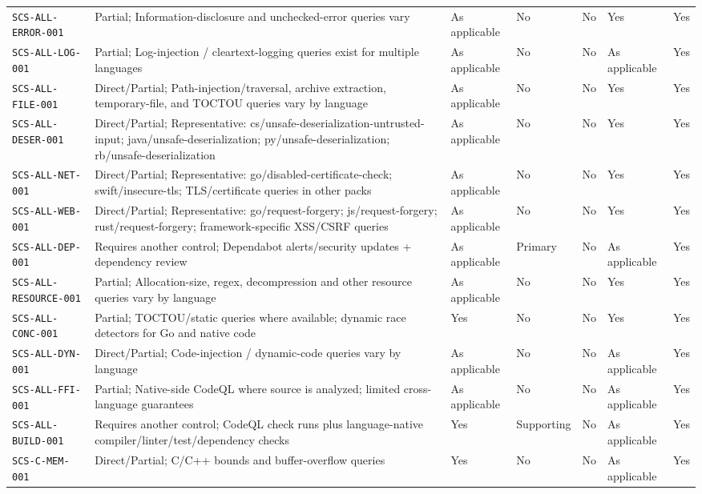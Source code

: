 \documentclass[10pt,letterpaper]{article}
\newcommand{\code}[1]{\begingroup\small\ttfamily\def\UrlFont{\ttfamily}\nolinkurl{#1}\endgroup}
\begin{document}
\begin{landscape}
\begin{longtable}{@{}P{1.4in}P{1.35in}P{1.1in}P{1.1in}P{0.95in}P{1.3in}P{1.0in}@{}}
\code{SCS-ALL-ERROR-001} & Partial; Information-disclosure and unchecked-error queries vary & As applicable & No & No & Yes & Yes\\
\code{SCS-ALL-LOG-001} & Partial; Log-injection / cleartext-logging queries exist for multiple languages & As applicable & No & No & As applicable & Yes\\
\code{SCS-ALL-FILE-001} & Direct/Partial; Path-injection/traversal, archive extraction, temporary-file, and TOCTOU queries vary by language & As applicable & No & No & Yes & Yes\\
\code{SCS-ALL-DESER-001} & Direct/Partial; Representative: cs/unsafe-deserialization-untrusted-input; java/unsafe-deserialization; py/unsafe-deserialization; rb/unsafe-deserialization & As applicable & No & No & Yes & Yes\\
\code{SCS-ALL-NET-001} & Direct/Partial; Representative: go/disabled-certificate-check; swift/insecure-tls; TLS/certificate queries in other packs & As applicable & No & No & Yes & Yes\\
\code{SCS-ALL-WEB-001} & Direct/Partial; Representative: go/request-forgery; js/request-forgery; rust/request-forgery; framework-specific XSS/CSRF queries & As applicable & No & No & Yes & Yes\\
\code{SCS-ALL-DEP-001} & Requires another control; Dependabot alerts/security updates + dependency review & As applicable & Primary & No & As applicable & Yes\\
\code{SCS-ALL-RESOURCE-001} & Partial; Allocation-size, regex, decompression and other resource queries vary by language & As applicable & No & No & Yes & Yes\\
\code{SCS-ALL-CONC-001} & Partial; TOCTOU/static queries where available; dynamic race detectors for Go and native code & Yes & No & No & Yes & Yes\\
\code{SCS-ALL-DYN-001} & Direct/Partial; Code-injection / dynamic-code queries vary by language & As applicable & No & No & As applicable & Yes\\
\code{SCS-ALL-FFI-001} & Partial; Native-side CodeQL where source is analyzed; limited cross-language guarantees & As applicable & No & No & As applicable & Yes\\
\code{SCS-ALL-BUILD-001} & Requires another control; CodeQL check runs plus language-native compiler/linter/test/dependency checks & Yes & Supporting & No & As applicable & Yes\\
\code{SCS-C-MEM-001} & Direct/Partial; C/C++ bounds and buffer-overflow queries & Yes & No & No & As applicable & Yes\\

\end{longtable}
\end{landscape}
\end{document}
